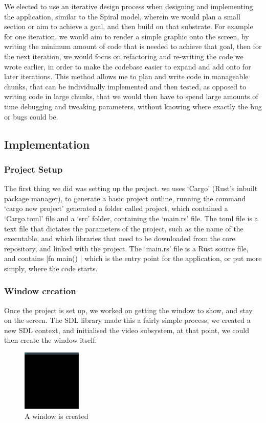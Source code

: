 \documentclass[../report.tex]{subfiles}
\begin{document}
We elected to use an iterative design process when designing and implementing the application, similar to the Spiral model, wherein we would plan a small section or aim to achieve a goal, and then build on that substrate. For example for one iteration, we would aim to render a simple graphic onto the screen, by writing the minimum amount of code that is needed to achieve that goal, then for the next iteration, we would focus on refactoring and re-writing the code we wrote earlier, in order to make the codebase easier to expand and add onto for later iterations.
This method allows me to plan and write code in manageable chunks, that can be individually implemented and then tested, as opposed to writing code in large chunks, that we would then have to spend large amounts of time debugging and tweaking parameters, without knowing where exactly the bug or bugs could be.

\subsection{Implementation}

\subsubsection{Project Setup}
The first thing we did was setting up the project. we uses `Cargo' (Rust's inbuilt package manager), to generate a basic project outline, running the command `cargo new project' generated a folder called project, which contained a `Cargo.toml' file and a `src' folder, containing the `main.rs' file.
The toml file is a text file that dictates the parameters of the project, such as the name of the executable, and which libraries that need to be downloaded from the core repository, and linked with the project.
The `main.rs' file is a Rust source file, and contains 
|fn main() {}|
which is the entry point for the application, or put more simply, where the code starts.

\subsubsection{Window creation}
Once the project is set up, we worked on getting the window to show, and stay on the screen. The SDL library made this a fairly simple process, we created a new SDL context, and initialised the video subsystem, at that point, we could then create the window itself.

\begin{figure}[h]
    \centering
    \includegraphics[width=0.25\textwidth]{images/blank_window.png}
    \caption{A window is created}
\end{figure}
\end{document}
